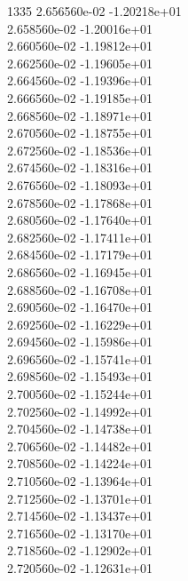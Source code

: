 1335	2.656560e-02	-1.20218e+01	\\ 	2.658560e-02	-1.20016e+01	\\ 	2.660560e-02	-1.19812e+01	\\ 	2.662560e-02	-1.19605e+01	\\ 	2.664560e-02	-1.19396e+01	\\ 	2.666560e-02	-1.19185e+01	\\ 	2.668560e-02	-1.18971e+01	\\ 	2.670560e-02	-1.18755e+01	\\ 	2.672560e-02	-1.18536e+01	\\ 	2.674560e-02	-1.18316e+01	\\ 	2.676560e-02	-1.18093e+01	\\ 	2.678560e-02	-1.17868e+01	\\ 	2.680560e-02	-1.17640e+01	\\ 	2.682560e-02	-1.17411e+01	\\ 	2.684560e-02	-1.17179e+01	\\ 	2.686560e-02	-1.16945e+01	\\ 	2.688560e-02	-1.16708e+01	\\ 	2.690560e-02	-1.16470e+01	\\ 	2.692560e-02	-1.16229e+01	\\ 	2.694560e-02	-1.15986e+01	\\ 	2.696560e-02	-1.15741e+01	\\ 	2.698560e-02	-1.15493e+01	\\ 	2.700560e-02	-1.15244e+01	\\ 	2.702560e-02	-1.14992e+01	\\ 	2.704560e-02	-1.14738e+01	\\ 	2.706560e-02	-1.14482e+01	\\ 	2.708560e-02	-1.14224e+01	\\ 	2.710560e-02	-1.13964e+01	\\ 	2.712560e-02	-1.13701e+01	\\ 	2.714560e-02	-1.13437e+01	\\ 	2.716560e-02	-1.13170e+01	\\ 	2.718560e-02	-1.12902e+01	\\ 	2.720560e-02	-1.12631e+01	\\ \hline
